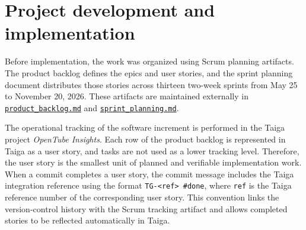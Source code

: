 \chapter{Project development and implementation}
\label{chap:development}

Before implementation, the work was organized using Scrum planning artifacts. The product backlog defines the epics and user stories, and the sprint planning document distributes those stories across thirteen two-week sprints from May 25 to November 20, 2026. These artifacts are maintained externally in \href{https://github.com/LONG-TERM-EFFECTS-OF-SUFFERING/thesis/tree/main/docs/product_backlog.md}{\texttt{product\_backlog.md}} and \href{https://github.com/LONG-TERM-EFFECTS-OF-SUFFERING/thesis/tree/main/docs/sprint_planning.md}{\texttt{sprint\_planning.md}}.

The operational tracking of the software increment is performed in the Taiga project \textit{OpenTube Insights}. Each row of the product backlog is represented in Taiga as a user story, and tasks are not used as a lower tracking level. Therefore, the user story is the smallest unit of planned and verifiable implementation work. When a commit completes a user story, the commit message includes the Taiga integration reference using the format \texttt{TG-\textless ref\textgreater\ \#done}, where \texttt{ref} is the Taiga reference number of the corresponding user story. This convention links the version-control history with the Scrum tracking artifact and allows completed stories to be reflected automatically in Taiga.








